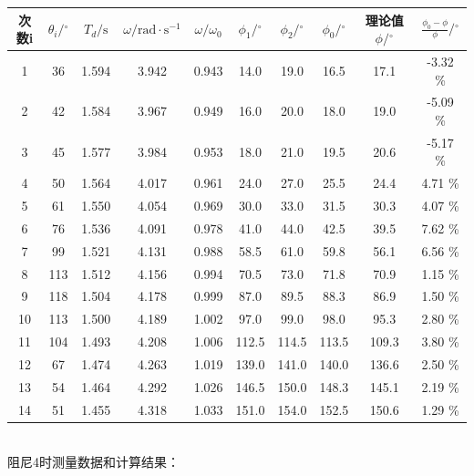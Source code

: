 \documentclass[UTF8]{ctexart}
\begin{document}
\begin{tabular}{|c|c|c|c|c|c|c|c|c|c|}
    \hline 次数i &    $\theta_{i} /{ }^{\circ}$ & $T_{d} / \mathrm{s}$ & $\omega / \mathrm{rad} \cdot \mathrm{s}^{-1} $&$ \omega / \omega_{0}$ & $\phi_{1} /{ }^{\circ} $& $\phi_{2} /{ }^{\circ}$ & $\phi_{0} /{ }^{\circ} $&  理论值 $ \phi /{ }^{\circ}$ & $\frac{\phi_{0}-\phi}{\phi} /{ }^{\circ}$ \\
    \hline 1 & 36 & 1.594 & 3.942 & 0.943 & 14.0 & 19.0 & 16.5 & 17.1 & -3.32 \% \\
    \hline 2 & 42 & 1.584 & 3.967 & 0.949 & 16.0 & 20.0 & 18.0 & 19.0 & -5.09 \% \\
    \hline 3 & 45 & 1.577 & 3.984 & 0.953 & 18.0 & 21.0 & 19.5 & 20.6 & -5.17 \% \\
    \hline 4 & 50 & 1.564 & 4.017 & 0.961 & 24.0 & 27.0 & 25.5 & 24.4 & 4.71 \% \\
    \hline 5 & 61 & 1.550 & 4.054 & 0.969 & 30.0 & 33.0 & 31.5 & 30.3 & 4.07 \% \\
    \hline 6 & 76 & 1.536 & 4.091 & 0.978 & 41.0 & 44.0 & 42.5 & 39.5 & 7.62 \% \\
    \hline 7 & 99 & 1.521 & 4.131 & 0.988 & 58.5 & 61.0 & 59.8 & 56.1 & 6.56 \% \\
    \hline 8 & 113 & 1.512 & 4.156 & 0.994 & 70.5 & 73.0 & 71.8 & 70.9 & 1.15 \% \\
    \hline 9 & 118 & 1.504 & 4.178 & 0.999 & 87.0 & 89.5 & 88.3 & 86.9 & 1.50 \% \\
    \hline 10 & 113 & 1.500 & 4.189 & 1.002 & 97.0 & 99.0 & 98.0 & 95.3 & 2.80 \% \\
    \hline 11 & 104 & 1.493 & 4.208 & 1.006 & 112.5 & 114.5 & 113.5 & 109.3 & 3.80 \% \\
    \hline 12 & 67 & 1.474 & 4.263 & 1.019 & 139.0 & 141.0 & 140.0 & 136.6 & 2.50 \% \\
    \hline 13 & 54 & 1.464 & 4.292 & 1.026 & 146.5 & 150.0 & 148.3 & 145.1 & 2.19 \% \\
    \hline 14 & 51 & 1.455 & 4.318 & 1.033 & 151.0 & 154.0 & 152.5 & 150.6 & 1.29 \% \\
    \hline
\end{tabular}\\

阻尼4时测量数据和计算结果：\\
\end{document}

